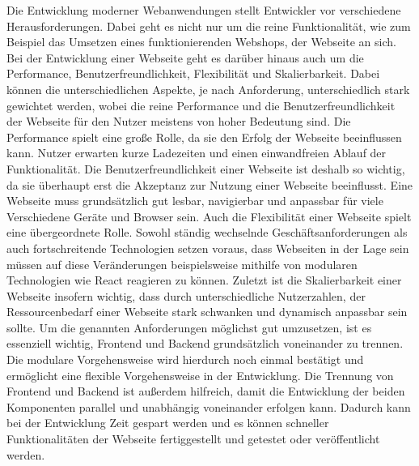 Die Entwicklung moderner Webanwendungen stellt Entwickler vor verschiedene Herausforderungen. Dabei geht es nicht nur um die reine Funktionalität, wie zum Beispiel das Umsetzen eines funktionierenden Webshops, der Webseite an sich. Bei der Entwicklung einer Webseite geht es darüber hinaus auch um die Performance, Benutzerfreundlichkeit, Flexibilität und Skalierbarkeit. Dabei können die unterschiedlichen Aspekte, je nach Anforderung, unterschiedlich stark gewichtet werden, wobei die reine Performance und die Benutzerfreundlichkeit der Webseite für den Nutzer meistens von hoher Bedeutung sind.
Die Performance spielt eine große Rolle, da sie den Erfolg der Webseite beeinflussen kann. Nutzer erwarten kurze Ladezeiten und einen einwandfreien Ablauf der Funktionalität.
Die Benutzerfreundlichkeit einer Webseite ist deshalb so wichtig, da sie überhaupt erst die Akzeptanz zur Nutzung einer Webseite beeinflusst. Eine Webseite muss grundsätzlich gut lesbar, navigierbar und anpassbar für viele Verschiedene Geräte und Browser sein.
Auch die Flexibilität einer Webseite spielt eine übergeordnete Rolle. Sowohl ständig wechselnde Geschäftsanforderungen als auch fortschreitende Technologien setzen voraus, dass Webseiten in der Lage sein müssen auf diese Veränderungen beispielsweise mithilfe von modularen Technologien wie React reagieren zu können.
Zuletzt ist die Skalierbarkeit einer Webseite insofern wichtig, dass durch unterschiedliche Nutzerzahlen, der Ressourcenbedarf einer Webseite stark schwanken und dynamisch anpassbar sein sollte.
Um die genannten Anforderungen möglichst gut umzusetzen, ist es essenziell wichtig, Frontend und Backend grundsätzlich voneinander zu trennen. Die modulare Vorgehensweise wird hierdurch noch einmal bestätigt und ermöglicht eine flexible Vorgehensweise in der Entwicklung. Die Trennung von Frontend und Backend ist außerdem hilfreich, damit die Entwicklung der beiden Komponenten parallel und unabhängig voneinander erfolgen kann. Dadurch kann bei der Entwicklung Zeit gespart werden und es können schneller Funktionalitäten der Webseite fertiggestellt und getestet oder veröffentlicht werden.